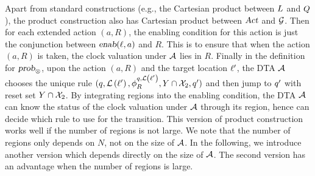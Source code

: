 Apart from standard constructions (e.g., the Cartesian product between $L$ and $Q$), the product construction also has Cartesian product between $\mbox{\sl Act}$ and $\mathcal{G}$. Then for each extended action $(a,R)$, the enabling condition for this action is just the conjunction between $\mbox{\sl enab}(\ell,a)$ and $R$.
This is to ensure that when the action $(a,R)$ is taken, the clock valuation under $\mathcal{A}$ lies in $R$.
Finally in the definition for $\mbox{\sl prob}_\otimes$, upon the action $(a,R)$ and the target location $\ell'$, the DTA $\mathcal{A}$ chooses the unique rule $(q,\mathcal{L}\left(\ell'\right), \phi^{q,\mathcal{L}\left(\ell'\right)}_R, Y\cap \mathcal{X}_2, q')$ and then jump to $q'$ with reset set $Y\cap \mathcal{X}_2$.
By integrating regions into the enabling condition, the DTA $\mathcal{A}$ can know the status of the clock valuation under $\mathcal{A}$ through its region, hence can decide which rule to use for the transition.
This version of product construction works well if the number of regions is not large.
We note that the number of regions only depends on $N$, not on the size of $\mathcal{A}$.
In the following, we introduce another version which depends directly on the size of $\mathcal{A}$.
The second version has an advantage when the number of regions is large.

